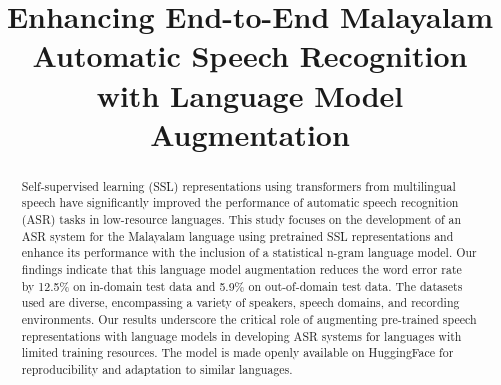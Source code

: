 \documentclass[runningheads]{llncs}
\begin{document}
%
\title{Enhancing End-to-End Malayalam Automatic Speech Recognition with Language Model Augmentation}


%
%
\maketitle              %
%
\begin{abstract}

Self-supervised learning (SSL) representations using transformers from multilingual speech have significantly improved the performance of automatic speech recognition (ASR) tasks in low-resource languages. This study focuses on the development of an ASR system for the Malayalam language using pretrained SSL representations and enhance its performance with the inclusion of a statistical n-gram language model. Our findings indicate that this language model augmentation reduces the word error rate by 12.5\% on in-domain test data and 5.9\% on out-of-domain test data. The datasets used are diverse, encompassing a variety of speakers, speech domains, and recording environments.  Our results underscore the critical role of augmenting pre-trained speech representations with language models in developing ASR systems for languages with limited training resources. The model is made openly available on HuggingFace for reproducibility and adaptation to similar languages.
 
\end{abstract}
\end{document}
